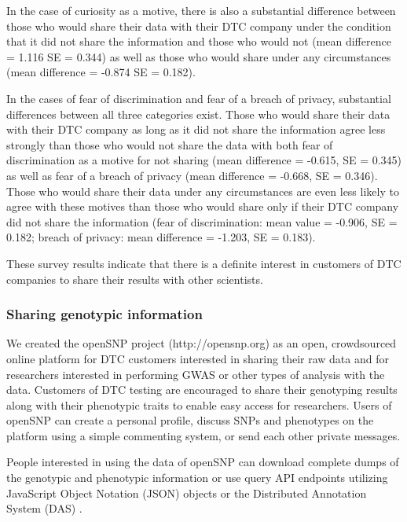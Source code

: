 \documentclass[10pt]{article}
\begin{document}
In the case of curiosity as a motive, there is also a substantial difference between those who would share their data with their DTC company under the condition that it did not share the information and those who would not (mean difference = 1.116 SE = 0.344) as well as those who would share under any circumstances (mean difference = -0.874 SE = 0.182).

In the cases of fear of discrimination and fear of a breach of privacy, substantial differences between all three categories exist. Those who would share their data with their DTC company as long as it did not share the information agree less strongly than those who would not share the data with both fear of discrimination as a motive for not sharing (mean difference = -0.615, SE = 0.345) as well as fear of a breach of privacy (mean difference = -0.668, SE = 0.346). Those who would share their data under any circumstances are even less likely to agree with these motives than those who would share only if their DTC company did not share the information (fear of discrimination: mean value = -0.906, SE = 0.182; breach of privacy: mean difference = -1.203, SE = 0.183).

These survey results indicate that there is a definite interest in customers of DTC companies to share their results with other scientists. 

\subsubsection*{Sharing genotypic information}

We created the openSNP project (http://opensnp.org) as an open, crowdsourced online platform for DTC customers interested in sharing their raw data and for researchers interested in performing GWAS or other types of analysis with the data. 
Customers of DTC testing are encouraged to share their genotyping results along with their phenotypic traits to enable easy access for researchers.
Users of openSNP can create a personal profile, discuss SNPs and phenotypes on the platform using a simple commenting system, or send each other private messages.

People interested in using the data of openSNP can download complete dumps of the genotypic and phenotypic information or use query API endpoints utilizing JavaScript Object Notation (JSON) objects or the Distributed Annotation System (DAS) \cite{Dowell2001}. 
\end{document}
